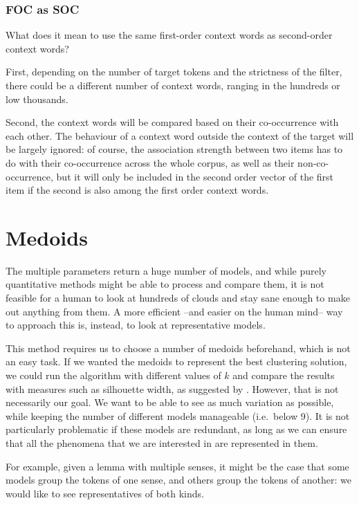 \documentclass[
]{book}
\begin{document}
\hypertarget{foc-as-soc}{%
\subsubsection{FOC as SOC}\label{foc-as-soc}}

What does it mean to use the same first-order context words as second-order context words?

First, depending on the number of target tokens and the strictness of the filter, there could be a different number of context words, ranging in the hundreds or low thousands.

Second, the context words will be compared based on their co-occurrence with each other. The behaviour of a context word outside the context of the target will be largely ignored: of course, the association strength between two items has to do with their co-occurrence across the whole corpus, as well as their non-co-occurrence, but it will only be included in the second order vector of the first item if the second is also among the first order context words.

\hypertarget{medoids}{%
\section{Medoids}\label{medoids}}

The multiple parameters return a huge number of models, and while purely quantitative methods might
be able to process and compare them, it is not feasible for a human to look at hundreds of clouds
and stay sane enough to make out anything from them. A more efficient --and easier on the human mind--
way to approach this is, instead, to look at representative models.

This method requires us to choose a number of medoids beforehand, which is not an easy
task. If we wanted the medoids to represent the best clustering solution, we could run
the algorithm with different values of \(k\) and compare the results with measures such
as silhouette width, as suggested by \textcite{levshina_2015}. However, that is not
necessarily our goal. We want to be able to see as much variation as possible, while keeping
the number of different models manageable (i.e.~below 9). It is not particularly problematic
if these models are redundant, as long as we can ensure that all the phenomena that we
are interested in are represented in them.

For example, given a lemma with multiple senses, it might be the case that some models
group the tokens of one sense, and others group the tokens of another: we would like to see
representatives of both kinds.
\end{document}

